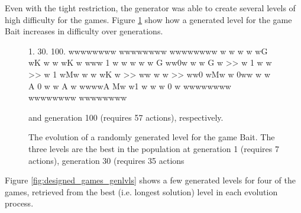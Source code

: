 \documentclass[a4paper,titlepage,final]{report}
\begin{document}
Even with the tight restriction, the generator was able to create several levels of high difficulty for the games.
Figure \ref{fig:lvlevolveprocess} show how a generated level for the game Bait increases in difficulty over generations.


\begin{figure}[!ht]
\centering
\begin{vgdldesc}[linewidth=14cm]
1.          30.         100.
wwwwwwww    wwwwwwww    wwwwwwww
w  w w w    wG  wK w    w   wK w
www 1  w    w   w  w    w G ww0w
w w G  w >> w 1  w w >> w 1  wMw
w w wK w >> ww  w  w >> ww0  wMw
w  0ww w    w A  0 w    w A    w
wwwwA Mw    w1  w  w    w   0  w
wwwwwwww    wwwwwwww    wwwwwwww
\end{vgdldesc}
\caption{The evolution of a randomly generated level for the game Bait. The three levels are the best in the population at generation 1 (requires 7 actions), generation 30 (requires 35 actions} and generation 100 (requires 57 actions), respectively.
\label{fig:lvlevolveprocess}
\end{figure}


Figure \ref{fig:designed_games_genlvls} shows a few generated levels for four of the games, retrieved from the best (i.e. longest solution) level in each evolution process.
\end{document}
